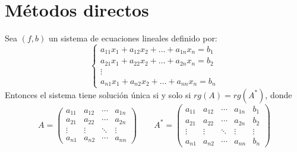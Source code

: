         \section{M{\'e}todos directos}
        \begin{teo}
             Sea $(f,b)$ un sistema de ecuaciones lineales definido por:
            $$\left\{\begin{array}{c}
                 a_{11}x_1+a_{12}x_2+\ldots+a_{1n}x_n=b_1  \\
                 a_{21}x_1+a_{22}x_2+\ldots+a_{2n}x_n=b_2 \\
                 \vdots \\
                 a_{n1}x_1+a_{n2}x_2+\ldots+a_{nn}x_n=b_n
            \end{array}\right.$$
            Entonces el sistema tiene solución única si y solo si $rg(A)=rg(A^*)$, donde
            $$A=\left(\begin{array}{cccc}
                 a_{11}&a_{12}&\cdots&a_{1n}  \\
                 a_{21} & a_{22}&\cdots & a_{2n}\\
                 \vdots & \vdots &\ddots &\vdots \\
                 a_{n1} & a_{n2}&\cdots & a_{nn}
            \end{array}\right)\qquad 
            A^*=\left(\begin{array}{ccccc}
                 a_{11}&a_{12}&\cdots&a_{1n} &b_1 \\
                 a_{21} & a_{22}&\cdots & a_{2n}&b_2\\
                 \vdots & \vdots &\ddots &\vdots&\vdots \\
                 a_{n1} & a_{n2}&\cdots & a_{nn}&b_n
            \end{array}\right)$$
        \end{teo}
